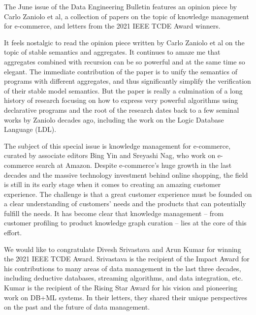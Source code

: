 \documentclass[11pt]{article}
\begin{document}
The June issue of the Data Engineering Bulletin features an opinion
piece by Carlo Zaniolo et al, a collection of papers on the topic of
knowledge management for e-commerce, and letters from the 2021 IEEE
TCDE Award winners.

It feels nostalgic to read the opinion piece written by Carlo Zaniolo
et al on the topic of stable semantics and aggregates. It continues to
amaze me that aggregates combined with recursion can be so powerful
and at the same time so elegant. The immediate contribution of the
paper is to unify the semantics of programs with different aggregates,
and thus significantly simplify the verification of their stable model
semantics. But the paper is really a culmination of a long history of
research focusing on how to express very powerful algorithms using
declarative programs and the root of the research dates back to a few
seminal works by Zaniolo decades ago, including the work on the Logic
Database Language (LDL).

The subject of this special issue is knowledge management for
e-commerce, curated by associate editors Bing Yin and Sreyashi Nag,
who work on e-commerce search at Amazon. Despite e-commerce's huge
growth in the last decades and the massive technology investment
behind online shopping, the field is still in its early stage when it
comes to creating an amazing customer experience. The challenge is
that a great customer experience must be founded on a clear
understanding of customers' needs and the products that can
potentially fulfill the needs. It has become clear that knowledge
management -- from customer profiling to product knowledge graph
curation -- lies at the core of this effort.

We would like to congratulate Divesh Srivastava and Arun Kumar for
winning the 2021 IEEE TCDE Award. Srivastava is the recipient of the
Impact Award for his contributions to many areas of data management in
the last three decades, including deductive databases, streaming
algorithms, and data integration, etc. Kumar is the recipient of the
Rising Star Award for his vision and pioneering work on DB+ML
systems. In their letters, they shared their unique perspectives on
the past and the future of data management.
\end{document}
